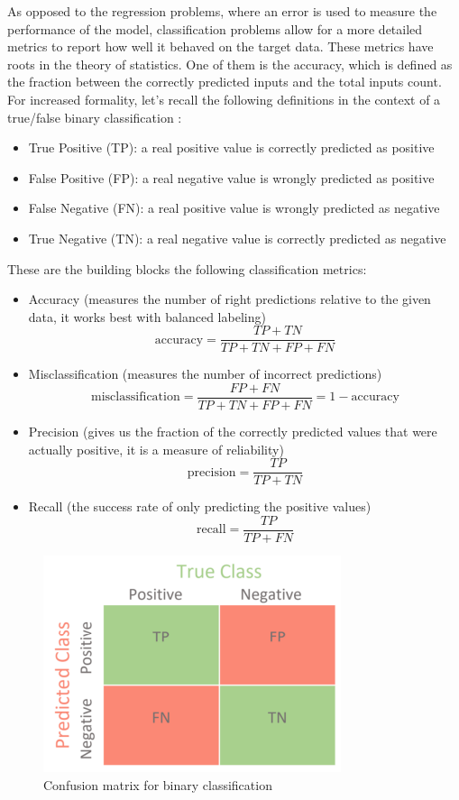 As opposed to the regression problems, where an error is used to measure the performance of the model, classification problems allow for a more detailed metrics to report how well it behaved on the target data. These metrics have roots in the theory of statistics. One of them is the accuracy, which is defined as the fraction between the correctly predicted inputs and the total inputs count. For increased formality, let's recall the following definitions in the context of a true/false binary classification \cite{confmat}:
\begin{itemize}
\item True Positive (TP): a real positive value is correctly predicted as positive
\item False Positive (FP): a real negative value is wrongly predicted as positive
\item False Negative (FN): a real positive value is wrongly predicted as negative
\item True Negative (TN): a real negative value is correctly predicted as negative
\end{itemize} 
These are the building blocks the following classification metrics:
\begin{itemize}
\item Accuracy (measures the number of right predictions relative to the given data, it works best with balanced labeling) \cite{confmat}
$$\mathrm{accuracy} = \frac{TP+TN}{TP+TN+FP+FN}$$ 
\item Misclassification (measures the number of incorrect predictions) \cite{confmat}
$$\mathrm{misclassification} = \frac{FP+FN}{TP+TN+FP+FN} = 1-\mathrm{accuracy}$$ 
\item Precision (gives us the fraction of the correctly predicted values that were actually positive, it is a measure of reliability) \cite{confmat}
$$\mathrm{precision} = \frac{TP}{TP+TN}$$ 
\item Recall (the success rate of only predicting the positive values) \cite{confmat}
$$\mathrm{recall} = \frac{TP}{TP+FN}$$ 
\end{itemize}

\begin{figure}[htbp]
	\centering
	\includegraphics[scale=0.65]{figures/confmat.PNG}
	\caption{Confusion matrix for binary classification\cite{confmat}}
	\label{FigConfMatTF}
\end{figure}


